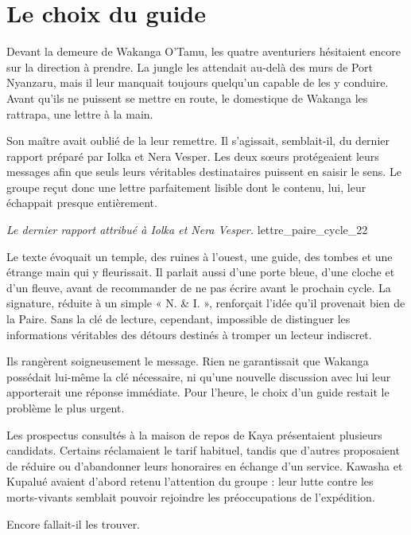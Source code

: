 \chapter{Le choix du guide}


Devant la demeure de Wakanga O'Tamu, les quatre aventuriers hésitaient encore sur la direction à prendre. La jungle les attendait au-delà des murs de Port Nyanzaru, mais il leur manquait toujours quelqu'un capable de les y conduire. Avant qu'ils ne puissent se mettre en route, le domestique de Wakanga les rattrapa, une lettre à la main.

Son maître avait oublié de la leur remettre. Il s'agissait, semblait-il, du dernier rapport préparé par Iolka et Nera Vesper. Les deux sœurs protégeaient leurs messages afin que seuls leurs véritables destinataires puissent en saisir le sens. Le groupe reçut donc une lettre parfaitement lisible dont le contenu, lui, leur échappait presque entièrement.

{\textit{Le dernier rapport attribué à Iolka et Nera Vesper.}}
{lettre_paire_cycle_22}

Le texte évoquait un temple, des ruines à l'ouest, une guide, des tombes et une étrange main qui y fleurissait. Il parlait aussi d'une porte bleue, d'une cloche et d'un fleuve, avant de recommander de ne pas écrire avant le prochain cycle. La signature, réduite à un simple « N. \& I. », renforçait l'idée qu'il provenait bien de la Paire. Sans la clé de lecture, cependant, impossible de distinguer les informations véritables des détours destinés à tromper un lecteur indiscret.

Ils rangèrent soigneusement le message. Rien ne garantissait que Wakanga possédait lui-même la clé nécessaire, ni qu'une nouvelle discussion avec lui leur apporterait une réponse immédiate. Pour l'heure, le choix d'un guide restait le problème le plus urgent.

\scenebreak

Les prospectus consultés à la maison de repos de Kaya présentaient plusieurs candidats. Certains réclamaient le tarif habituel, tandis que d'autres proposaient de réduire ou d'abandonner leurs honoraires en échange d'un service. Kawasha et Kupalué avaient d'abord retenu l'attention du groupe : leur lutte contre les morts-vivants semblait pouvoir rejoindre les préoccupations de l'expédition.

Encore fallait-il les trouver.

